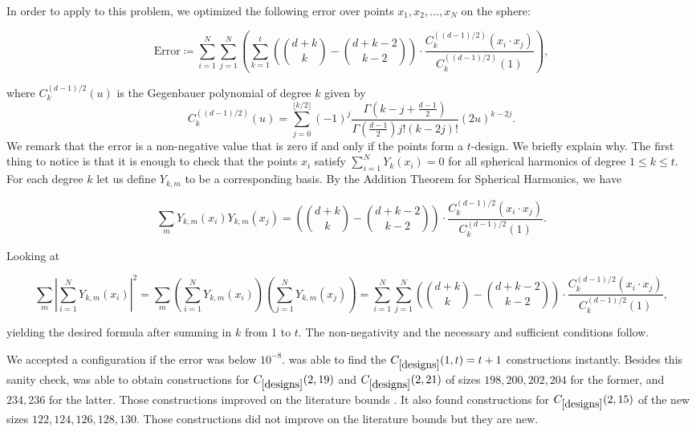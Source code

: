 In order to apply \AlphaEvolve to this problem, we optimized the following error over points $x_1,x_2,\ldots,x_N$ on the sphere:

\begin{equation}
\text{Error} \coloneqq \sum_{i=1}^{N} \sum_{j=1}^{N} \left( \sum_{k=1}^{t} \left(\binom{d+k}{k} - \binom{d+k-2}{k-2}\right) \cdot \frac{C_k^{((d-1)/2)}(x_i \cdot x_j)}{C_k^{((d-1)/2)}(1)} \right),
\end{equation}

where $C_k^{(d-1)/2}(u)$ is the Gegenbauer polynomial of degree $k$ given by $$C_k^{((d-1)/2)}(u) = \sum_{j=0}^{\lfloor k/2 \rfloor} (-1)^j \frac{\Gamma\left(k - j + \frac{d-1}{2}\right)}{\Gamma\left(\frac{d-1}{2}\right)j!(k - 2j)!} (2u)^{k-2j}.$$ We remark that the error is a non-negative value that is zero if and only if the points form a $t$-design. We briefly explain why. The first thing to notice is that it is enough to check that the points $x_i$ satisfy $\sum_{i=1}^{N} Y_k(x_i) = 0$ for all spherical harmonics of degree $1 \leq k \leq t$. For each degree $k$ let us define $Y_{k,m}$ to be a corresponding basis. By the Addition Theorem for Spherical Harmonics, we have

$$\sum_{m} Y_{k,m}(x_i) Y_{k,m}(x_j) = \left(\binom{d+k}{k} - \binom{d+k-2}{k-2}\right) \cdot \frac{C_k^{(d-1)/2}(x_i \cdot x_j)}{C_k^{(d-1)/2}(1)}.$$


Looking at

$$\sum_{m}^{} \left| \sum_{i=1}^{N} Y_{k,m}(x_i) \right|^2 = \sum_{m} \left( \sum_{i=1}^{N} Y_{k,m}(x_i) \right) \left( \sum_{j=1}^{N} Y_{k,m}(x_j) \right) = \sum_{i=1}^{N} \sum_{j=1}^{N} \left(\binom{d+k}{k} - \binom{d+k-2}{k-2}\right) \cdot \frac{C_k^{(d-1)/2}(x_i \cdot x_j)}{C_k^{(d-1)/2}(1)},$$

yielding the desired formula after summing in $k$ from 1 to $t$. The non-negativity and the necessary and sufficient conditions follow.

We accepted a configuration if the error was below $10^{-8}$. \AlphaEvolve was able to find the $C_{\ref{designs}}(1,t) = t+1$ constructions instantly. Besides this sanity check, \AlphaEvolve was able to obtain constructions for $C_{\ref{designs}}(2,19)$ and $C_{\ref{designs}}(2,21)$ of sizes $198,200,202,204$ for the former, and $234,236$ for the latter. Those constructions improved on the literature bounds \cite{sloane_spherical}. It also found constructions for $C_{\ref{designs}}(2,15)$ of the new sizes  $122,124,126,128,130$. Those constructions did not improve on the literature bounds but they are new.

